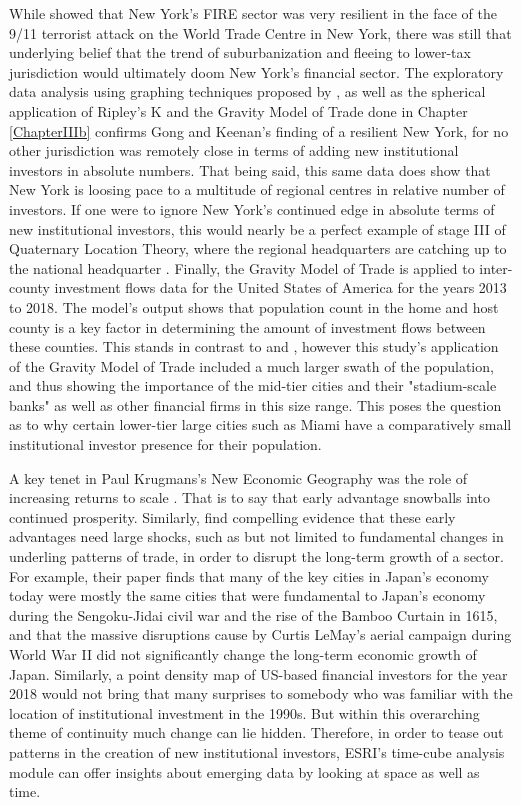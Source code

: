 While \cite{gongthe2012} showed that New York's FIRE sector was very resilient in the face of the 9/11 terrorist attack on the World Trade Centre in New York, there was still that underlying belief that the trend of suburbanization and fleeing to lower-tax jurisdiction would ultimately doom New York's financial sector.  The exploratory data analysis using graphing techniques proposed by  \cite{tufte1998visual}, as well as the spherical application of Ripley's K and the Gravity Model of Trade done in Chapter \ref{ChapterIIIb} confirms Gong and Keenan's finding of a resilient New York, for no other jurisdiction was remotely close in terms of adding new institutional investors in absolute numbers.  That being said, this same data does show that New York is loosing pace to a multitude of regional centres in relative number of investors.  If one were to ignore New York's continued edge in absolute terms of new institutional investors, this would nearly be a perfect example of  stage III of Quaternary Location Theory, where the regional headquarters are catching up to the national headquarter \citep{Semple_Phipps82}.  Finally, the Gravity Model of Trade is applied to inter-county investment flows data for the United States of America for the years 2013 to 2018.  The model's output shows that population count in the home and host county is a key factor in determining the amount of investment flows between these counties.  This stands in contrast to \cite{greena1993} and \cite{GreenOLef2014}, however this study's application of the Gravity Model of Trade included a much larger swath of the population, and thus showing the importance of the mid-tier cities and their "stadium-scale banks" as well as other financial firms in this size range. This poses the question as to why certain lower-tier large cities such as Miami have a comparatively small institutional investor presence for their population.  

A key tenet in Paul Krugmans's New Economic Geography was the role of increasing returns to scale \citep{krugman1991increasing}.  That is to say that early advantage snowballs into continued prosperity.  Similarly, \cite{davis2002bones} find compelling evidence that these early advantages need large shocks, such as but not limited to fundamental changes in underling patterns of trade, in order to disrupt the long-term growth of a sector.  For example, their paper finds that many of the key cities in Japan's economy today were mostly the same cities that were fundamental to Japan's economy during the Sengoku-Jidai civil war and the rise of the Bamboo Curtain in 1615, and that the massive disruptions cause by Curtis LeMay's aerial campaign during World War II did not significantly change the long-term economic growth of Japan.  Similarly, a point density map of US-based financial investors for the year 2018 would not bring that many surprises to somebody who was familiar with the location of institutional investment in the 1990s.  But within this overarching theme of continuity much change can lie hidden.  Therefore, in order to tease out patterns in the creation of new institutional investors, ESRI's time-cube analysis module can offer insights about emerging data by looking at space as well as time. 

